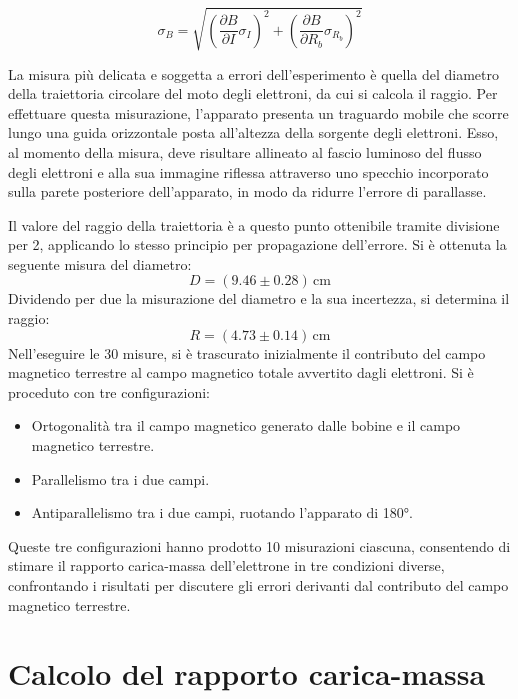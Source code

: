 \documentclass[a4paper,12pt]{article}
\begin{document}
\begin{equation}
    \sigma_B = \sqrt{\left( \frac{\partial B}{\partial I} \sigma_I \right)^2 + \left( \frac{\partial B}{\partial R_b} \sigma_{R_b} \right)^2}
    \label{eq:incertezza_campo_magnetico}
\end{equation}

La misura più delicata e soggetta a errori dell’esperimento è quella del diametro della traiettoria circolare del moto degli elettroni, da cui si calcola il raggio. Per effettuare questa misurazione, l’apparato presenta un traguardo mobile che scorre lungo una guida orizzontale posta all’altezza della sorgente degli elettroni. Esso, al momento della misura, deve risultare allineato al fascio luminoso del flusso degli elettroni e alla sua immagine riflessa attraverso uno specchio incorporato sulla parete posteriore dell’apparato, in modo da ridurre l’errore di parallasse.

Il valore del raggio della traiettoria è a questo punto ottenibile tramite divisione per 2, applicando lo stesso principio per propagazione dell’errore. Si è ottenuta la seguente misura del diametro:
\begin{equation}
    D = (9.46 \pm 0.28) \, \text{cm}
    \label{eq:diametro_traiettoria}
\end{equation}
Dividendo per due la misurazione del diametro e la sua incertezza, si determina il raggio:
\begin{equation}
    R = (4.73 \pm 0.14) \, \text{cm}
    \label{eq:raggio_traiettoria}
\end{equation}
Nell’eseguire le 30 misure, si è trascurato inizialmente il contributo del campo magnetico terrestre al campo magnetico totale avvertito dagli elettroni. Si è proceduto con tre configurazioni:
\begin{itemize}
    \item Ortogonalità tra il campo magnetico generato dalle bobine e il campo magnetico terrestre.
    \item Parallelismo tra i due campi.
    \item Antiparallelismo tra i due campi, ruotando l’apparato di 180°.
\end{itemize}
Queste tre configurazioni hanno prodotto 10 misurazioni ciascuna, consentendo di stimare il rapporto carica-massa dell’elettrone in tre condizioni diverse, confrontando i risultati per discutere gli errori derivanti dal contributo del campo magnetico terrestre.


\section{Calcolo del rapporto carica-massa}
\end{document}
